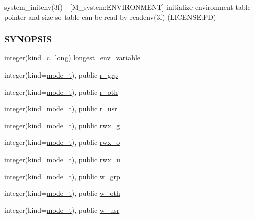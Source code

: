 \begin{DoxyCompactItemize}
\begin{DoxyCompactList}
system\+\_\+initenv(3f) -\/ \mbox{[}M\+\_\+system\+:E\+N\+V\+I\+R\+O\+N\+M\+E\+NT\mbox{]} initialize environment table pointer and size so table can be read by readenv(3f) (L\+I\+C\+E\+N\+SE\+:PD) \subsubsection*{S\+Y\+N\+O\+P\+S\+IS}\end{DoxyCompactList}\item 
integer(kind=c\+\_\+long) \mbox{\hyperlink{namespacem__system_ac066b6866f8ef4b8c358ec8daca7566c}{longest\+\_\+env\+\_\+variable}}
\item 
integer(kind=\mbox{\hyperlink{namespacem__system_abdb5cc27c945379d844db4830d499050}{mode\+\_\+t}}), public \mbox{\hyperlink{namespacem__system_a9f6b88434cd895d01081eead0ec994e9}{r\+\_\+grp}}
\item 
integer(kind=\mbox{\hyperlink{namespacem__system_abdb5cc27c945379d844db4830d499050}{mode\+\_\+t}}), public \mbox{\hyperlink{namespacem__system_a144868e3f7e98d339ba59eac96a413b7}{r\+\_\+oth}}
\item 
integer(kind=\mbox{\hyperlink{namespacem__system_abdb5cc27c945379d844db4830d499050}{mode\+\_\+t}}), public \mbox{\hyperlink{namespacem__system_a26b623dd9e8e115960edbb0f252ccf6b}{r\+\_\+usr}}
\item 
integer(kind=\mbox{\hyperlink{namespacem__system_abdb5cc27c945379d844db4830d499050}{mode\+\_\+t}}), public \mbox{\hyperlink{namespacem__system_a23010fa4addcb4c58b4cb0334a4fdec0}{rwx\+\_\+g}}
\item 
integer(kind=\mbox{\hyperlink{namespacem__system_abdb5cc27c945379d844db4830d499050}{mode\+\_\+t}}), public \mbox{\hyperlink{namespacem__system_a4a602e6ffd2e4b24dc7d80b5e8db3d02}{rwx\+\_\+o}}
\item 
integer(kind=\mbox{\hyperlink{namespacem__system_abdb5cc27c945379d844db4830d499050}{mode\+\_\+t}}), public \mbox{\hyperlink{namespacem__system_a126dc96188cde6e9932e1775868b3059}{rwx\+\_\+u}}
\item 
integer(kind=\mbox{\hyperlink{namespacem__system_abdb5cc27c945379d844db4830d499050}{mode\+\_\+t}}), public \mbox{\hyperlink{namespacem__system_afbbb4a0d04bc0dbaad651a6ab04ffaef}{w\+\_\+grp}}
\item 
integer(kind=\mbox{\hyperlink{namespacem__system_abdb5cc27c945379d844db4830d499050}{mode\+\_\+t}}), public \mbox{\hyperlink{namespacem__system_a82b69c635bb9cd191b867efdf2003d9b}{w\+\_\+oth}}
\item 
integer(kind=\mbox{\hyperlink{namespacem__system_abdb5cc27c945379d844db4830d499050}{mode\+\_\+t}}), public \mbox{\hyperlink{namespacem__system_ace39a3c0b26d21381c2956b78a8822d5}{w\+\_\+usr}}

\end{DoxyCompactItemize}
